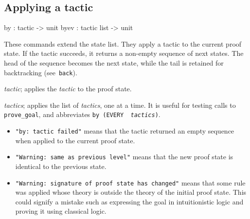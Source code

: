 \subsection{Applying a tactic}
\begin{ttbox} 
by   : tactic -> unit
byev : tactic list -> unit
\end{ttbox}
These commands extend the state list.  They apply a tactic to the current
proof state.  If the tactic succeeds, it returns a non-empty sequence of
next states.  The head of the sequence becomes the next state, while the
tail is retained for backtracking (see~\texttt{back}).
\begin{ttdescription} \item[\ttindexbold{by} {\it tactic};] 
applies the {\it tactic\/} to the proof state.

\item[\ttindexbold{byev} {\it tactics};] 
applies the list of {\it tactics}, one at a time.  It is useful for testing
calls to \texttt{prove_goal}, and abbreviates \texttt{by (EVERY {\it
tactics})}.
\end{ttdescription}

\nobreak
\begin{itemize}
\item {\footnotesize\tt "by:\ tactic failed"} means that the tactic
  returned an empty sequence when applied to the current proof state.
\item {\footnotesize\tt "Warning:\ same as previous level"} means that the
  new proof state is identical to the previous state.
\item{\footnotesize\tt "Warning:\ signature of proof state has changed"}
  means that some rule was applied whose theory is outside the theory of
  the initial proof state.  This could signify a mistake such as expressing
  the goal in intuitionistic logic and proving it using classical logic.
\end{itemize}

